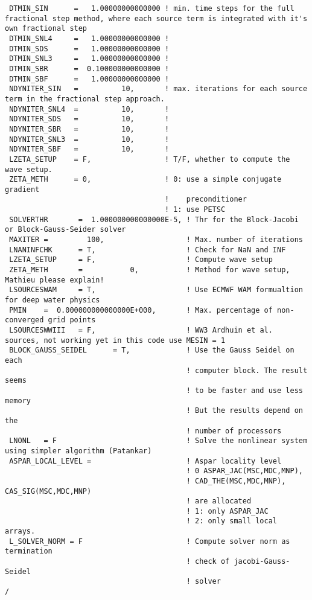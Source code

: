 \documentclass[12pt]{amsart}
\begin{document}
\begin{verbatim}
 DTMIN_SIN      =   1.00000000000000 ! min. time steps for the full fractional step method, where each source term is integrated with it's own fractional step
 DTMIN_SNL4     =   1.00000000000000 !    
 DTMIN_SDS      =   1.00000000000000 !    
 DTMIN_SNL3     =   1.00000000000000 !   
 DTMIN_SBR      =  0.100000000000000 !    
 DTMIN_SBF      =   1.00000000000000 !    
 NDYNITER_SIN   =          10,       ! max. iterations for each source term in the fractional step approach. 
 NDYNITER_SNL4  =          10,       !
 NDYNITER_SDS   =          10,       !
 NDYNITER_SBR   =          10,       !
 NDYNITER_SNL3  =          10,       ! 
 NDYNITER_SBF   =          10,       !
 LZETA_SETUP    = F,                 ! T/F, whether to compute the wave setup.
 ZETA_METH      = 0,                 ! 0: use a simple conjugate gradient
                                     !    preconditioner
                                     ! 1: use PETSC
 SOLVERTHR       =  1.000000000000000E-5, ! Thr for the Block-Jacobi or Block-Gauss-Seider solver
 MAXITER =         100,                   ! Max. number of iterations 
 LNANINFCHK      = T,                     ! Check for NaN and INF
 LZETA_SETUP     = F,                     ! Compute wave setup 
 ZETA_METH       =           0,           ! Method for wave setup, Mathieu please explain!
 LSOURCESWAM     = T,                     ! Use ECMWF WAM formualtion for deep water physics 
 PMIN    =  0.000000000000000E+000,       ! Max. percentage of non-converged grid points 
 LSOURCESWWIII   = F,                     ! WW3 Ardhuin et al. sources, not working yet in this code use MESIN = 1 
 BLOCK_GAUSS_SEIDEL      = T,             ! Use the Gauss Seidel on each
                                          ! computer block. The result seems
                                          ! to be faster and use less memory
                                          ! But the results depend on the
                                          ! number of processors
 LNONL   = F                              ! Solve the nonlinear system using simpler algorithm (Patankar) 
 ASPAR_LOCAL_LEVEL =                      ! Aspar locality level
                                          ! 0 ASPAR_JAC(MSC,MDC,MNP),
                                          ! CAD_THE(MSC,MDC,MNP), CAS_SIG(MSC,MDC,MNP)
                                          ! are allocated
                                          ! 1: only ASPAR_JAC
                                          ! 2: only small local arrays.
 L_SOLVER_NORM = F                        ! Compute solver norm as termination
                                          ! check of jacobi-Gauss-Seidel
                                          ! solver
/
\end{verbatim}
\end{document}
